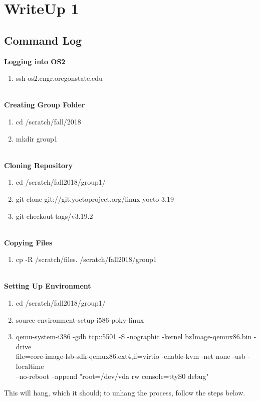 \documentclass[letterpaper,10pt]{article}
\begin{document}

\section{WriteUp 1}


\subsection{Command Log}
{\bfseries Logging into OS2}\\
\begin{enumerate}
\item ssh os2.engr.oregonstate.edu\\\\
\end{enumerate}
{\bfseries Creating Group Folder}\\
\begin{enumerate}
\item cd /scratch/fall/2018\\
\item mkdir group1\\\\
\end{enumerate}
{\bfseries Cloning Repository}\\
\begin{enumerate}
\item cd /scratch/fall2018/group1/\\
\item git clone git://git.yoctoproject.org/linux-yocto-3.19\\
\item git checkout tags/v3.19.2\\\\
\end{enumerate}
{\bfseries Copying Files}\\
\begin{enumerate}
\item cp -R /scratch/files. /scratch/fall2018/group1\\\\
\end{enumerate}
{\bfseries Setting Up Environment}\\
\begin{enumerate}
\item cd /scratch/fall2018/group1/\\
\item source environment-setup-i586-poky-linux\\
\item qemu-system-i386 -gdb tcp::5501 -S -nographic -kernel bzImage-qemux86.bin -drive\\ file=core-image-lsb-sdk-qemux86.ext4,if=virtio -enable-kvm -net none -usb -localtime\\
--no-reboot --append "root=/dev/vda rw console=ttyS0 debug"\\
\end{enumerate}
This will hang, which it should; to unhang the process, follow the steps below.\\
\end{document}
